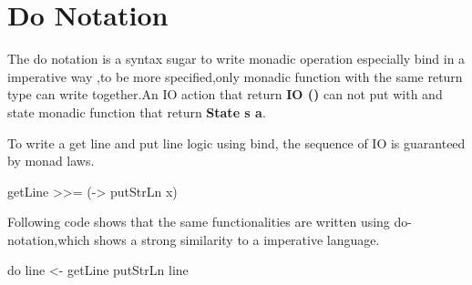 \section{Do Notation }
The do notation is a syntax sugar to write monadic operation especially bind in a imperative way ,to be more specified,only monadic function with the same return type can write together.An IO action that return \textbf{IO ()} can not put with and state monadic function that return \textbf{State s a}.

To write a get line and put line logic using bind, the sequence of IO is guaranteed by monad laws.
\begin{hcode}
 getLine >>= (\x -> putStrLn x)
\end{hcode}


Following code shows that the same functionalities are written using do-notation,which shows a strong similarity to a imperative language.
\begin{hcode}
do line <- getLine 
   putStrLn line
\end{hcode}


